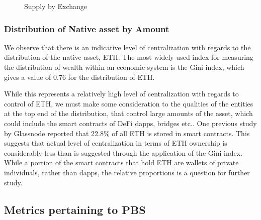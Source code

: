 \documentclass[conference]{IEEEtran}
\begin{document}
\begin{figure}[ht]
    \caption{Supply by Exchange}
    \label{fig:supply-exchange}
\end{figure}

\subsubsection{Distribution of Native asset by Amount}

We observe that there is an indicative level of centralization with regards to the distribution of the native asset, ETH.  The most widely used index for measuring the distribution of wealth within an economic system is the Gini index, which gives a value of 0.76 for the distribution of ETH.

While this represents a relatively high level of centralization with regards to control of ETH, we must make some consideration to the qualities of the entities at the top end of the distribution, that control large amounts of the asset, which could include the smart contracts of DeFi dapps, bridges etc..  One previous study by Glassnode \cite{checkmate2021} reported that 22.8\% of all ETH is stored in smart contracts.  This suggests that actual level of centralization in terms of ETH ownership is considerably less than is suggested through the  application of the Gini index.  While a portion of the smart contracts that hold ETH are wallets of private individuals, rather than dapps, the relative proportions is a question for further study.

\subsection{Metrics pertaining to PBS}
\end{document}
